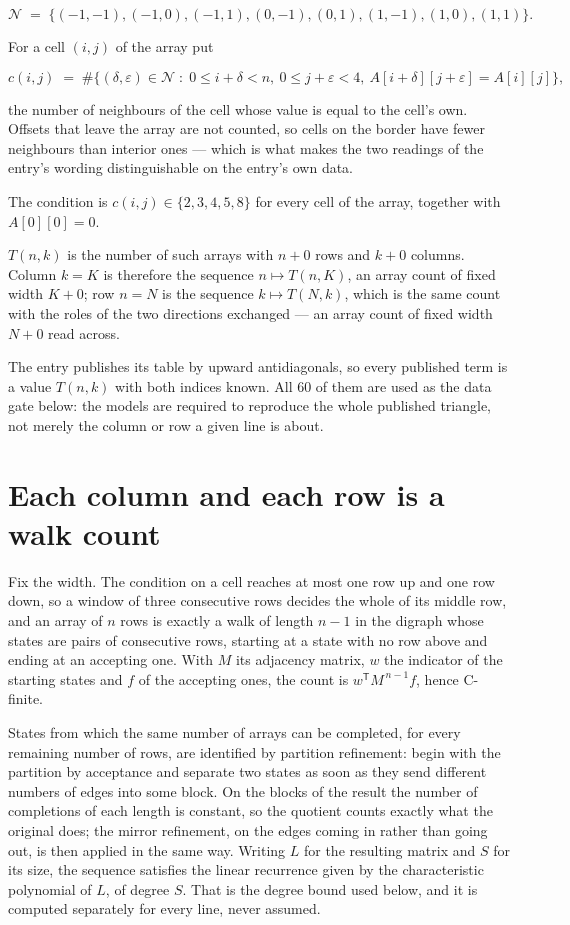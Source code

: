 \documentclass[11pt]{article}
\theoremstyle{definition}
\begin{document}
\[\mathcal{N} \;=\; \{(-1,-1), (-1,0), (-1,1), (0,-1), (0,1), (1,-1), (1,0), (1,1)\}.\]

For a cell $(i,j)$ of the array put

\[c(i,j) \;=\; \#\bigl\{(\delta,\varepsilon)\in\mathcal{N} \;:\; 0\le i+\delta<n,\ 0\le j+\varepsilon<4,\ A[i+\delta][j+\varepsilon] = A[i][j]\bigr\},\]

the number of neighbours of the cell whose value is equal to the cell's own. Offsets that leave the array are not counted, so cells on the border have fewer neighbours than interior ones --- which is what makes the two readings of the entry's wording distinguishable on the entry's own data.

The condition is $c(i,j) \in \{2, 3, 4, 5, 8\}$ for every cell of the array, together with $A[0][0]=0$.

$T(n,k)$ is the number of such arrays with $n + 0$ rows and $k + 0$ columns. Column $k = K$ is therefore the sequence $n \mapsto T(n,K)$, an array count of fixed width $K + 0$; row $n = N$ is the sequence $k \mapsto T(N,k)$, which is the same count with the roles of the two directions exchanged --- an array count of fixed width $N + 0$ read across.

The entry publishes its table by upward antidiagonals, so every published term is a value $T(n,k)$ with both indices known. All 60 of them are used as the data gate below: the models are required to reproduce the whole published triangle, not merely the column or row a given line is about.

\section{Each column and each row is a walk count}

Fix the width. The condition on a cell reaches at most one row up and one row down, so a window of three consecutive rows decides the whole of its middle row, and an array of $n$ rows is exactly a walk of length $n-1$ in the digraph whose states are pairs of consecutive rows, starting at a state with no row above and ending at an accepting one. With $M$ its adjacency matrix, $w$ the indicator of the starting states and $f$ of the accepting ones, the count is $w^{\mathsf T}M^{\,n-1}f$, hence C-finite.

States from which the same number of arrays can be completed, for every remaining number of rows, are identified by partition refinement: begin with the partition by acceptance and separate two states as soon as they send different numbers of edges into some block. On the blocks of the result the number of completions of each length is constant, so the quotient counts exactly what the original does; the mirror refinement, on the edges coming in rather than going out, is then applied in the same way. Writing $L$ for the resulting matrix and $S$ for its size, the sequence satisfies the linear recurrence given by the characteristic polynomial of $L$, of degree $S$. That is the degree bound used below, and it is computed separately for every line, never assumed.
\end{document}
